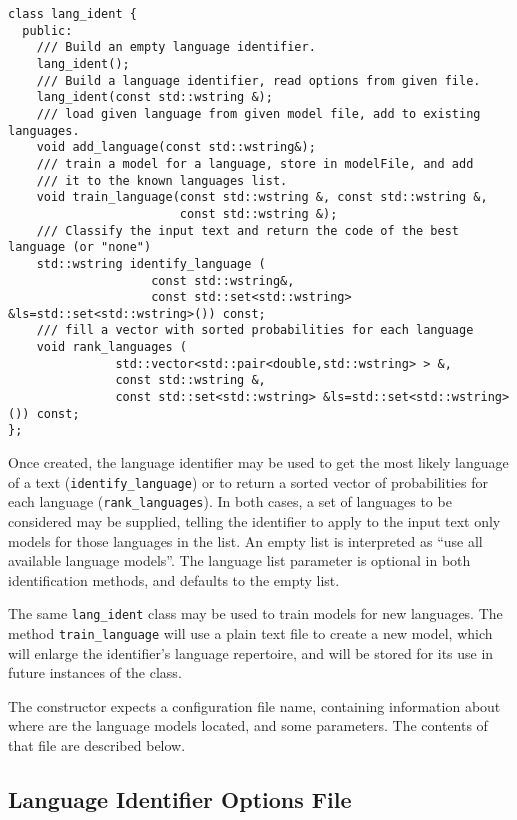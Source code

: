 \documentclass[a4paper]{book}
\begin{document}
\begin{verbatim}
class lang_ident {
  public:
    /// Build an empty language identifier.
    lang_ident();
    /// Build a language identifier, read options from given file.
    lang_ident(const std::wstring &);
    /// load given language from given model file, add to existing languages.
    void add_language(const std::wstring&);
    /// train a model for a language, store in modelFile, and add 
    /// it to the known languages list.
    void train_language(const std::wstring &, const std::wstring &, 
                        const std::wstring &);
    /// Classify the input text and return the code of the best language (or "none")
    std::wstring identify_language (
                    const std::wstring&, 
                    const std::set<std::wstring> &ls=std::set<std::wstring>()) const; 
    /// fill a vector with sorted probabilities for each language
    void rank_languages (
               std::vector<std::pair<double,std::wstring> > &, 
               const std::wstring &,
               const std::set<std::wstring> &ls=std::set<std::wstring>()) const;
};
\end{verbatim}

  Once created, the language identifier may be used to get the most
  likely language of a text (\verb#identify_language#) or to return a
  sorted vector of probabilities for each language
  (\verb#rank_languages#).  In both cases, a set of languages to be
  considered may be supplied, telling the identifier to apply to the
  input text only models for those languages in the list. An empty
  list is interpreted as ``use all available language models''.
  The language list parameter is optional in both identification methods, 
  and defaults to the empty list.

  The same \verb#lang_ident# class may be used to train models for new
  languages. The method \verb#train_language# will use a plain text
  file to create a new model, which will enlarge the identifier's
  language repertoire, and will be stored for its use in future
  instances of the class.

  The constructor expects a configuration file name, containing
  information about where are the language models located, and some
  parameters. The contents of that file are described below.

\subsection{Language Identifier Options File}
\end{document}
